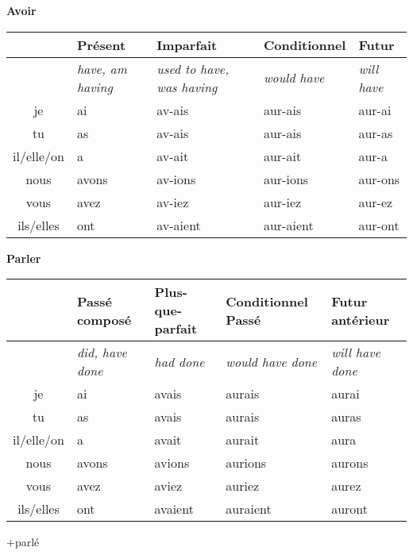 \begin{flushleft}
\textbf{Avoir}
\vskip 0.1cm
\begin{tabular}{|c||L{2.5cm}|L{2.5cm}|L{2.5cm}|L{2.5cm}|}
\hline
& Pr\'esent & Imparfait & Conditionnel & Futur \\
\hline
& \textit{have, am having} & \textit{used to have, was having} & \textit{would have} & \textit{will have} \\
\hline\hline
je            &	ai	&	av-ais	&	aur-ais	 &	aur-ai	\\
tu            &	as 	&	av-ais	&	aur-ais	&	aur-as	\\
il/elle/on  &	a	&	av-ait	&	aur-ait	&	aur-a	\\
nous       &	avons	&	av-ions	&	aur-ions	&	aur-ons	\\
vous       &	avez	&	av-iez	&	aur-iez		&	aur-ez	\\
ils/elles   &	ont 	&	av-aient	&	aur-aient	&	aur-ont	\\
\hline
\end{tabular}
\end{flushleft}

\begin{flushleft}
\textbf{Parler}
\vskip 0.1cm
\begin{tabular}{|c||L{2.5cm}|L{2.5cm}|L{2.5cm}|L{2.5cm}|}
\hline
& Pass\'e compos\'e & Plus-que-parfait & Conditionnel Pass\'e & Futur ant\'erieur \\
\hline
& \textit{did, have done} & \textit{had done} & \textit{would have done} & \textit{will have done} \\
\hline\hline
je            &	ai	&	avais	&	aurais	 &	aurai	\\
tu            &	as 	&	avais	&	aurais	&	auras	\\
il/elle/on  &	a	&	avait	&	aurait	&	aura	\\
nous       &	avons	&	avions	&	aurions	&	aurons	\\
vous       &	avez	&	aviez	&	auriez		&	aurez	\\
ils/elles   &	ont 	&	avaient	&	auraient	&	auront	\\
\hline
\end{tabular}
\quad$+$\quad parl\'e
\end{flushleft}

